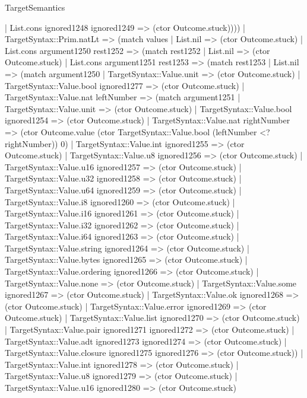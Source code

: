 \begin{lexlean}{TargetSemantics}
\begin{semanticmodule}
{          | List.cons ignored1248 ignored1249 => (ctor Outcome.stuck))))
    | TargetSyntax::Prim.natLt => (match values
      | List.nil => (ctor Outcome.stuck)
      | List.cons argument1250 rest1252 => (match rest1252
        | List.nil => (ctor Outcome.stuck)
        | List.cons argument1251 rest1253 => (match rest1253
          | List.nil => (match argument1250
            | TargetSyntax::Value.unit => (ctor Outcome.stuck)
            | TargetSyntax::Value.bool ignored1277 => (ctor Outcome.stuck)
            | TargetSyntax::Value.nat leftNumber => (match argument1251
              | TargetSyntax::Value.unit => (ctor Outcome.stuck)
              | TargetSyntax::Value.bool ignored1254 => (ctor Outcome.stuck)
              | TargetSyntax::Value.nat rightNumber => (ctor Outcome.value (ctor TargetSyntax::Value.bool (leftNumber <? rightNumber)) 0)
              | TargetSyntax::Value.int ignored1255 => (ctor Outcome.stuck)
              | TargetSyntax::Value.u8 ignored1256 => (ctor Outcome.stuck)
              | TargetSyntax::Value.u16 ignored1257 => (ctor Outcome.stuck)
              | TargetSyntax::Value.u32 ignored1258 => (ctor Outcome.stuck)
              | TargetSyntax::Value.u64 ignored1259 => (ctor Outcome.stuck)
              | TargetSyntax::Value.i8 ignored1260 => (ctor Outcome.stuck)
              | TargetSyntax::Value.i16 ignored1261 => (ctor Outcome.stuck)
              | TargetSyntax::Value.i32 ignored1262 => (ctor Outcome.stuck)
              | TargetSyntax::Value.i64 ignored1263 => (ctor Outcome.stuck)
              | TargetSyntax::Value.string ignored1264 => (ctor Outcome.stuck)
              | TargetSyntax::Value.bytes ignored1265 => (ctor Outcome.stuck)
              | TargetSyntax::Value.ordering ignored1266 => (ctor Outcome.stuck)
              | TargetSyntax::Value.none => (ctor Outcome.stuck)
              | TargetSyntax::Value.some ignored1267 => (ctor Outcome.stuck)
              | TargetSyntax::Value.ok ignored1268 => (ctor Outcome.stuck)
              | TargetSyntax::Value.error ignored1269 => (ctor Outcome.stuck)
              | TargetSyntax::Value.list ignored1270 => (ctor Outcome.stuck)
              | TargetSyntax::Value.pair ignored1271 ignored1272 => (ctor Outcome.stuck)
              | TargetSyntax::Value.adt ignored1273 ignored1274 => (ctor Outcome.stuck)
              | TargetSyntax::Value.closure ignored1275 ignored1276 => (ctor Outcome.stuck))
            | TargetSyntax::Value.int ignored1278 => (ctor Outcome.stuck)
            | TargetSyntax::Value.u8 ignored1279 => (ctor Outcome.stuck)
            | TargetSyntax::Value.u16 ignored1280 => (ctor Outcome.stuck)
}
\end{semanticmodule}
\end{lexlean}
